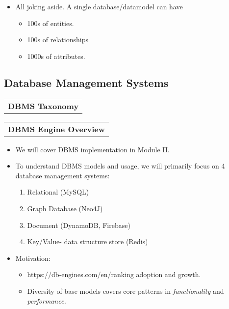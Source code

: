 \documentclass[11pt]{article}
\providecommand{\tightlist}{%
      \setlength{\itemsep}{0pt}\setlength{\parskip}{0pt}}
\begin{document}
\begin{itemize}
\tightlist
\item
  All joking aside. A single database/datamodel can have

  \begin{itemize}
  \tightlist
  \item
    100s of entities.
  \item
    100s of relationships
  \item
    1000s of attributes.
  \end{itemize}
\end{itemize}

    \subsection{Database Management
Systems}\label{database-management-systems}

\begin{longtable}[]{@{}c@{}}
\toprule
\tabularnewline
\midrule
\endhead
\textbf{DBMS Taxonomy}\tabularnewline
\bottomrule
\end{longtable}

\begin{longtable}[]{@{}c@{}}
\toprule
\tabularnewline
\midrule
\endhead
\textbf{DBMS Engine Overview}\tabularnewline
\bottomrule
\end{longtable}

    \begin{itemize}
\item
  We will cover DBMS implementation in Module II.
\item
  To understand DBMS models and usage, we will primarily focus on 4
  database management systems:

  \begin{enumerate}
  \def\labelenumi{\arabic{enumi}.}
  \item
    Relational (MySQL)
  \item
    Graph Database (Neo4J)
  \item
    Document (DynamoDB, Firebase)
  \item
    Key/Value- data structure store (Redis)
  \end{enumerate}
\item
  Motivation:

  \begin{itemize}
  \tightlist
  \item
    https://db-engines.com/en/ranking adoption and growth.
  \item
    Diversity of base models covers core patterns in
    \emph{functionality} and \emph{performance.}
  \end{itemize}
\end{itemize}
\end{document}
